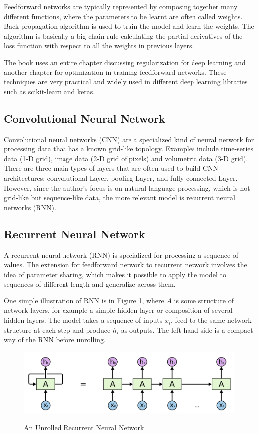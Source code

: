 \documentclass[11pt]{article}
\theoremstyle{plain}
\begin{document}
Feedforward networks are typically represented by composing together many 
different functions, where the parameters to be learnt are often called 
weights. Back-propagation algorithm is used to train the model and learn the 
weights. The algorithm is basically a big chain rule calculating the partial 
derivatives of the loss function with respect to all the weights in previous 
layers. 

The book \cite{Goodfellow-et-al-2016} uses an entire chapter discussing 
regularization for deep learning and another chapter for optimization in 
training feedforward networks. These techniques are very practical and 
widely used in different deep learning libraries such as scikit-learn and keras. 

\subsection{Convolutional Neural Network}
Convolutional neural networks (CNN) are a specialized kind of neural network 
for processing data that has a known grid-like topology. Examples include 
time-series data (1-D grid), image data (2-D grid of pixels) and volumetric 
data (3-D grid). There are three main types of layers that are often used to 
build CNN architectures: convolutional Layer, pooling Layer, and 
fully-connected Layer. However, since the author's focus is on natural 
language processing, which is not grid-like but sequence-like data, the more 
relevant model is recurrent neural networks (RNN).

\subsection{Recurrent Neural Network}
A recurrent neural network (RNN) is specialized for processing a sequence of 
values. The extension for feedforward network to recurrent network involves 
the idea of parameter sharing, which makes it possible to apply the model to 
sequences of different length and generalize across them. 

One simple illustration of RNN is in Figure \ref{fg:unroll-rnn}, where $A$ is 
some structure of network layers, for example a simple hidden layer or 
composition of several hidden layers. The model takes a sequence of inputs 
$x_i$, feed to the same network structure at each step and produce $h_i$ as 
outputs. The left-hand side is a compact way of the RNN before unrolling. 

\begin{figure}[!ht]
	\centering\includegraphics[width=\columnwidth]{images/unfold-rnn.png}
	\caption{An Unrolled Recurrent Neural Network 
	}\label{fg:unroll-rnn}\cite{olah-blog-lstm}
\end{figure}
\end{document}
